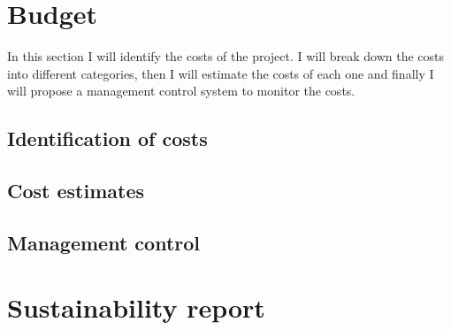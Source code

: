 \chapter{Budget}
In this section I will identify the costs of the project. 
I will break down the costs into different categories, then I will estimate the costs of each one and finally I will propose a management control system to monitor the costs.
    
\section{Identification of costs}

\section{Cost estimates}

\section{Management control}

\chapter{Sustainability report}